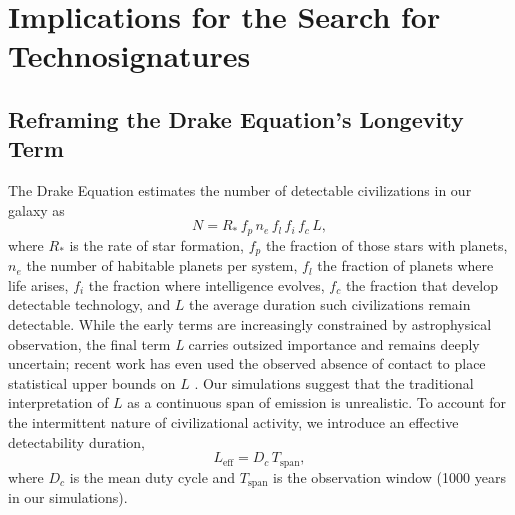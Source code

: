 \section{Implications for the Search for Technosignatures}\label{technosignatures-implications}

\subsection{Reframing the Drake Equation's Longevity Term}\label{reframing-drake}

The Drake Equation \citep{Drake1965-wp} estimates the number of detectable civilizations in our galaxy as
\begin{equation}
N = R_*\, f_p\, n_e\, f_l\, f_i\, f_c\, L ,
\label{eq:drake}
\end{equation}
where \(R_{*}\) is the rate of star formation, \(f_{p}\) the fraction of those stars with planets, \(n_{e}\) the number of habitable planets per system, \(f_{l}\) the fraction of planets where life arises, \(f_{i}\) the fraction where intelligence evolves, \(f_{c}\) the fraction that develop detectable technology, and \(L\) the average duration such civilizations remain detectable. While the early terms are increasingly constrained by astrophysical observation, the final term \emph{L} carries outsized importance and remains deeply uncertain; recent work has even used the observed absence of contact to place statistical upper bounds on $L$ \citep{Rahvar2026-lt}. Our simulations suggest that the traditional interpretation of $L$ as a continuous span of emission is unrealistic. To account for the intermittent nature of civilizational activity, we introduce an effective detectability duration,
\begin{equation}
L_{\mathrm{eff}} = D_c \, T_{\mathrm{span}} ,
\label{eq:leff}
\end{equation}
where \(D_{c}\) is the mean duty cycle and \(T_{\mathrm{span}}\) is the observation window (1000 years in our simulations).

